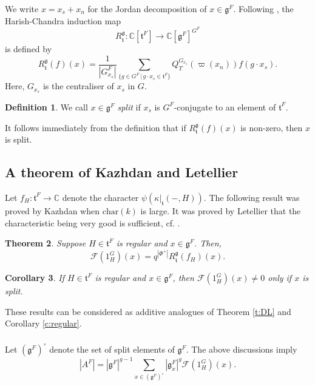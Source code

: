 \documentclass[12pt]{amsart}
\theoremstyle{plain}
\newtheorem{thm}{Theorem}
\newtheorem{cor}[thm]{Corollary}
\theoremstyle{definition}
\newtheorem{defe}[thm]{Definition}
\theoremstyle{remark}
\newcommand{\ra}{\rightarrow}
\newcommand{\bC}{\mathbb{C}}
\newcommand{\bA}{{A}}
\newcommand{\fg}{\mathfrak{g}}
\newcommand{\ft}{\mathfrak{t}}
\begin{document}
\subsubsection{}   We write $x=x_s+x_n$ for the Jordan decomposition of $x\in \fg^F$. Following \cite{Letellier05}, the Harish-Chandra induction map 
\[
{R_{\ft}^{\fg}: \bC[\ft^F]\ra \bC[\fg^F]^{G^F}}
\]
is defined by 
\[
R_{\ft}^{\fg} (f)(x) = \frac{1}{|G_{x_s}^F|} \sum_{\{g\in G^F\, | \, g\cdot x_s\in \ft^F\}} Q_{T}^{G_{x_s}}(\varpi(x_n)) f(g\cdot x_s). 
\]
Here, $G_{x_s}$ is the centraliser of $x_s$ in $G$.  



\begin{defe} 
We call $x\in \fg^F$ \emph{split} if $x_s$ is $G^F$-conjugate to an element of $\ft^F$. 
\end{defe} 
It follows immediately from the definition that if $R_{\ft}^{\fg}(f)(x)$ is non-zero, then $x$ is split. 



\subsection{A theorem of Kazhdan and Letellier} 
  Let $f_H: \ft^F\ra \bC$ denote the character $\psi(\kappa|_{\ft}(-,H))$. The following result was proved by Kazhdan when $\mathrm{char}(k)$ is large. It was proved by Letellier that the characteristic being very good is sufficient, cf. \cite[Theorem 7.3.3]{Letellier05}. 

\begin{thm} Suppose $H\in \ft^F$ is regular and $x\in \fg^F$. Then,  
\[
\mathcal{F}(1_{H}^G)(x) =q^{|\Phi^+|} R_{\ft}^{\fg}(f_H)(x).
\] 
\label{t:KL}
\end{thm} 

\begin{cor} If $H\in \ft^F$ is regular and $x\in \fg^F$, then $\mathcal{F}(1_{H}^G)(x) \neq 0$ only if $x$ is split.
\end{cor} 

These results can be considered as additive analogues of Theorem \ref{t:DL} and Corollary \ref{c:regular}. 


\subsubsection{} 
 Let $(\fg^F)^\circ$ denote the set of split elements of $\fg^F$. The above discussions imply
\[
|\bA^F| = |\fg^F|^{g-1}  \sum_{x\in (\fg^F)^\circ}|\fg_{x}^F|^{g} \mathcal{F}(1_{H}^G)(x).
\]
\end{document}
